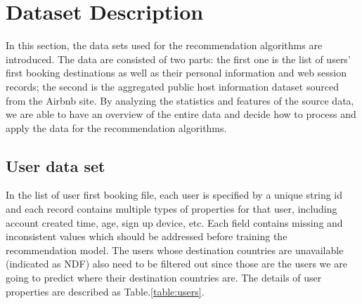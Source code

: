\documentclass{sig-alternate-05-2015}
\begin{document}
\section{Dataset Description}
In this section, the data sets used for the recommendation algorithms are introduced. The data are consisted of two parts: the first one is the list of users' first booking destinations as well as their personal information and web session records; the second is the aggregated public host information dataset sourced from the Airbnb site. By analyzing the statistics and features of the source data, we are able to have an overview of the entire data and decide how to process and apply the data for the recommendation algorithms.

\subsection{User data set}
In the list of user first booking file, each user is specified by a unique string id and each record contains multiple types of properties for that user, including account created time, age, sign up device, etc. Each field contains missing and inconsistent values which should be addressed before training the recommendation model. The users whose destination countries are unavailable (indicated as NDF) also need to be filtered out since those are the users we are going to predict where their destination countries are. The details of user properties are described as Table.\ref{table:users}.
\end{document}
